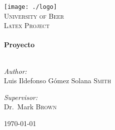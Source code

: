 \begin{titlepage}

\begin{center}


\texttt{[image: ./logo]}\\[1cm]    

\textsc{\LARGE University of Beer}\\[1.5cm]

\textsc{\Large Latex Project}\\[0.5cm]


\HRule \\[0.4cm]
{ \huge \bfseries Proyecto}\\[0.4cm]

\HRule \\[1.5cm]

\begin{minipage}{0.4\textwidth}
\begin{flushleft} \large
\emph{Author:}\\
Luis Ildefonso Gómez Solana \textsc{Smith}
\end{flushleft}
\end{minipage}
\begin{minipage}{0.4\textwidth}
\begin{flushright} \large
\emph{Supervisor:} \\
Dr.~Mark \textsc{Brown}
\end{flushright}
\end{minipage}

\vfill

{\large \today}

\end{center}

\end{titlepage}
